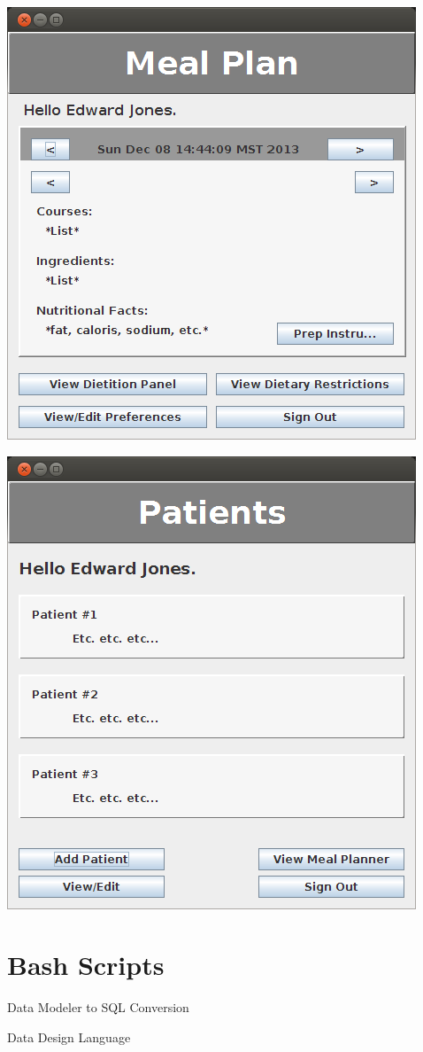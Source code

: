 \documentclass[a4paper,10pt,toc=graduated]{article}
\begin{document}
\begin{appendices}
\includegraphics{screenshots/frmUserMain.png}

\includegraphics{screenshots/frmDietitionMain.png}
\section{Bash Scripts}
\begin{mySubsection}{Data Modeler to SQL Conversion}

\end{mySubsection}
\begin{mySubsection}{Data Design Language}

\end{mySubsection}

\end{appendices}
\end{document}
